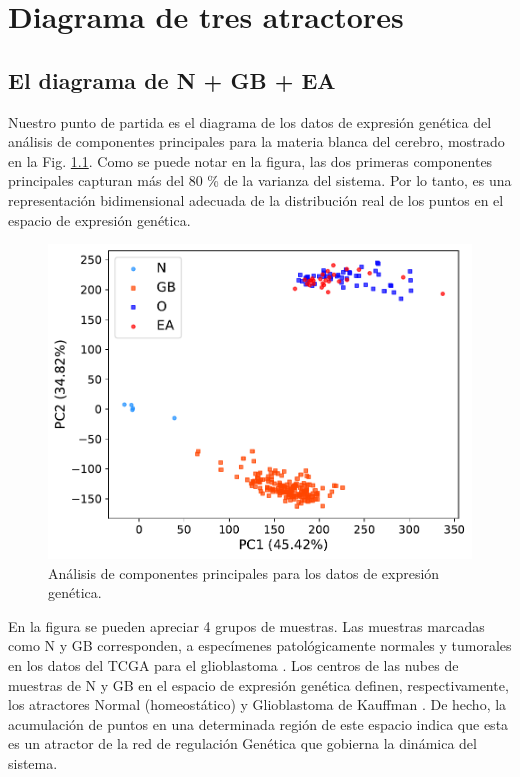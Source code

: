 \chapter{Diagrama de tres atractores}
\label{cap2}
\onehalfspacing


\section{El diagrama de N + GB + EA}\label{sec:ngbad}

Nuestro punto de partida es el diagrama de los datos de expresión genética del análisis de componentes principales para la materia blanca del cerebro, mostrado en la Fig. \ref{fig:fig1a}. Como se puede notar en la figura, las dos primeras componentes principales capturan más del 80 \% de la varianza del sistema. Por lo tanto, es una representación bidimensional adecuada de la distribución real de los puntos en el espacio de expresión genética.

\begin{figure}[!htb]
	\centering
	\includegraphics[width=0.75\linewidth]{figures/Fig_1a.pdf}
	\caption{\label{fig:fig1a}
		Análisis de componentes principales para los datos de expresión genética.}
\end{figure}

En la figura se pueden apreciar 4 grupos de muestras. Las muestras marcadas como N y GB corresponden, a especímenes patológicamente normales y tumorales en los datos del TCGA para el glioblastoma \cite{Brennan_2013}. Los centros de las nubes de muestras de N y GB en el espacio de expresión genética definen, respectivamente, los atractores Normal (homeostático) y Glioblastoma de Kauffman \cite{Huang_2009, Gonzalez_2023}. De hecho, la acumulación de puntos en una determinada región de este espacio indica que esta es un atractor de la red de regulación Genética que gobierna la dinámica del sistema.

